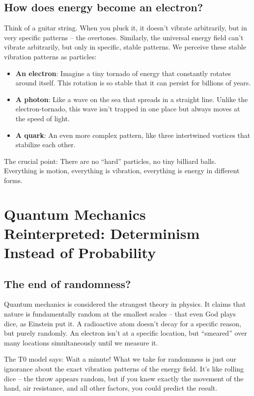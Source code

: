 	\subsection{How does energy become an electron?}
	
	Think of a guitar string. When you pluck it, it doesn't vibrate arbitrarily, but in very specific patterns -- the overtones. Similarly, the universal energy field can't vibrate arbitrarily, but only in specific, stable patterns. We perceive these stable vibration patterns as particles:
	
	\begin{itemize}
		\item \textbf{An electron}: Imagine a tiny tornado of energy that constantly rotates around itself. This rotation is so stable that it can persist for billions of years.
		
		\item \textbf{A photon}: Like a wave on the sea that spreads in a straight line. Unlike the electron-tornado, this wave isn't trapped in one place but always moves at the speed of light.
		
		\item \textbf{A quark}: An even more complex pattern, like three intertwined vortices that stabilize each other.
	\end{itemize}
	
	The crucial point: There are no ``hard'' particles, no tiny billiard balls. Everything is motion, everything is vibration, everything is energy in different forms.
	
	\section{Quantum Mechanics Reinterpreted: Determinism Instead of Probability}
	
	\subsection{The end of randomness?}
	
	Quantum mechanics is considered the strangest theory in physics. It claims that nature is fundamentally random at the smallest scales -- that even God plays dice, as Einstein put it. A radioactive atom doesn't decay for a specific reason, but purely randomly. An electron isn't at a specific location, but ``smeared'' over many locations simultaneously until we measure it.
	
	The T0 model says: Wait a minute! What we take for randomness is just our ignorance about the exact vibration patterns of the energy field. It's like rolling dice -- the throw appears random, but if you knew exactly the movement of the hand, air resistance, and all other factors, you could predict the result.
	
